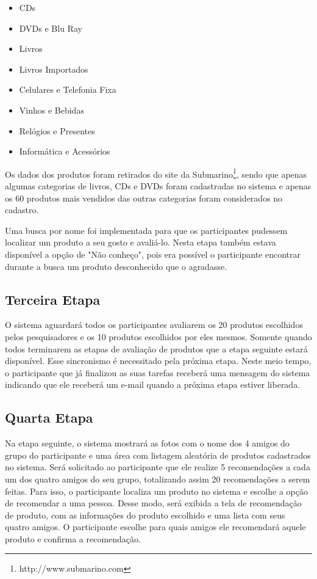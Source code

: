  \begin{itemize}
	\item CDs
	\item DVDs e Blu Ray
	\item Livros
	\item Livros Importados
	\item Celulares e Telefonia Fixa
	\item Vinhos e Bebidas
	\item Relógios e Presentes
	\item Informática e Acessórios
\end{itemize} 
 
 
 Os dados dos produtos foram retirados do site da Submarino\footnote{http://www.submarino.com}, sendo que apenas algumas categorias de livros, CDs e DVDs foram cadastradas no sistema e apenas os 60 produtos mais vendidos das outras categorias foram considerados no cadastro.
 
 Uma busca por nome foi implementada para que os participantes pudessem localizar um produto a seu gosto e avaliá-lo. Nesta etapa também estava disponível a opção de "Não conheço", pois era possível o participante encontrar durante a busca um produto desconhecido que o agradasse.
 
\subsection{Terceira Etapa}

 O sistema aguardará todos os participantes avaliarem os 20 produtos escolhidos pelos pesquisadores e os 10 produtos escolhidos por eles mesmos. Somente quando todos terminarem as etapas de avaliação de produtos que a etapa seguinte estará disponível. Esse sincronismo é necessitado pela próxima etapa. Neste meio tempo, o participante que já finalizou as suas tarefas receberá uma mensagem do sistema indicando que ele receberá um e-mail quando a próxima etapa estiver liberada.

\subsection{Quarta Etapa}

 Na etapa seguinte, o sistema mostrará as fotos com o nome dos 4 amigos do grupo do participante e uma área com listagem aleatória de produtos cadastrados no sistema. Será solicitado ao participante que ele realize 5 recomendações a cada um dos quatro amigos do seu grupo, totalizando assim 20 recomendações a serem feitas. Para isso, o participante localiza um produto no sistema e escolhe a opção de recomendar a uma pessoa. Desse modo, será exibida a tela de recomendação de produto, com as informações do produto escolhido e uma lista com seus quatro amigos. O participante escolhe para quais amigos ele recomendará aquele produto e confirma a recomendação.
 
